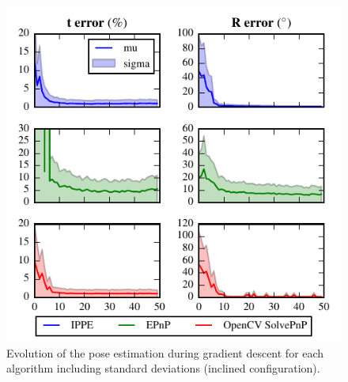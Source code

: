 \documentclass[letterpaper, 10 pt, conference]{ieeeconf}  %
\begin{document}
	\begin{figure}[t]
		\begin{center}
			\includegraphics[width=\columnwidth]{img/pose_separate_inclined.pdf}
			\caption{\label{fig:homography_results} Evolution of the pose estimation during gradient descent for each algorithm including standard deviations (inclined configuration).}
		\end{center}
	\end{figure}
	
	
	
\end{document}
